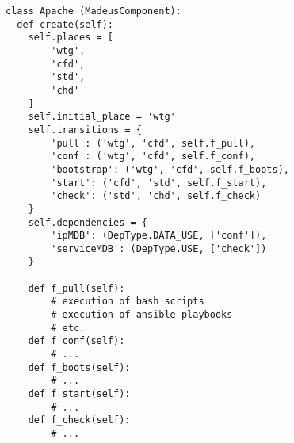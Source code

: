 \begin{lstlisting}[label=codeapache,caption=Madeus code of the Apache
  component type.]
class Apache (MadeusComponent):
  def create(self):
    self.places = [
        'wtg',
        'cfd',
        'std',
        'chd'
    ]
    self.initial_place = 'wtg'
    self.transitions = {
        'pull': ('wtg', 'cfd', self.f_pull),
        'conf': ('wtg', 'cfd', self.f_conf),
        'bootstrap': ('wtg', 'cfd', self.f_boots),
        'start': ('cfd', 'std', self.f_start),
        'check': ('std', 'chd', self.f_check)
    }
    self.dependencies = {
        'ipMDB': (DepType.DATA_USE, ['conf']),
        'serviceMDB': (DepType.USE, ['check'])
    }

    def f_pull(self):
        # execution of bash scripts
        # execution of ansible playbooks
        # etc.
    def f_conf(self):
        # ...
    def f_boots(self):
        # ...
    def f_start(self):
        # ...
    def f_check(self):
        # ...
\end{lstlisting}
